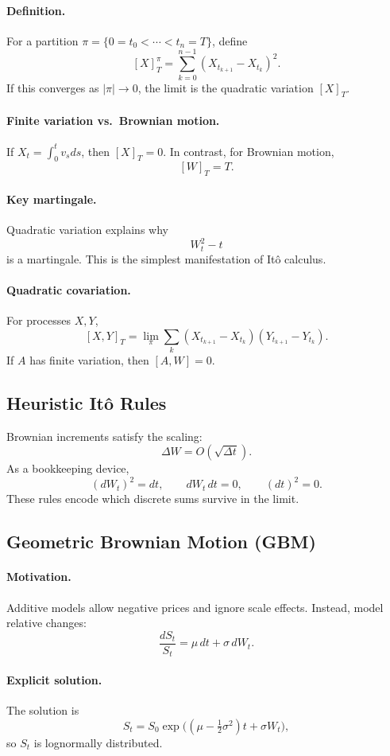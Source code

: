 \documentclass[11pt]{article}
\newcommand{\1}{\mathbf{1}}
\theoremstyle{plain}
\theoremstyle{definition}
\theoremstyle{remark}
\begin{document}
\paragraph{Definition.}
For a partition $\pi=\{0=t_0<\cdots<t_n=T\}$, define
\[
[X]^\pi_T=\sum_{k=0}^{n-1}(X_{t_{k+1}}-X_{t_k})^2.
\]
If this converges as $|\pi|\to0$, the limit is the quadratic variation $[X]_T$.

\paragraph{Finite variation vs.\ Brownian motion.}
If $X_t=\int_0^t v_s ds$, then $[X]_T=0$.
In contrast, for Brownian motion,
\[
[W]_T=T.
\]

\paragraph{Key martingale.}
Quadratic variation explains why
\[
W_t^2-t
\]
is a martingale.
This is the simplest manifestation of Itô calculus.

\paragraph{Quadratic covariation.}
For processes $X,Y$,
\[
[X,Y]_T=\lim_{\pi}\sum_k (X_{t_{k+1}}-X_{t_k})(Y_{t_{k+1}}-Y_{t_k}).
\]
If $A$ has finite variation, then $[A,W]=0$.

\subsection{Heuristic It\^o Rules}

Brownian increments satisfy the scaling:
\[
\Delta W = O(\sqrt{\Delta t}).
\]
As a bookkeeping device,
\[
(dW_t)^2=dt,
\qquad
dW_t\,dt=0,
\qquad
(dt)^2=0.
\]
These rules encode which discrete sums survive in the limit.

\subsection{Geometric Brownian Motion (GBM)}

\paragraph{Motivation.}
Additive models allow negative prices and ignore scale effects.
Instead, model relative changes:
\[
\frac{dS_t}{S_t}=\mu\,dt+\sigma\,dW_t.
\]

\paragraph{Explicit solution.}
The solution is
\[
S_t=S_0\exp\!\Big(
(\mu-\tfrac12\sigma^2)t+\sigma W_t
\Big),
\]
so $S_t$ is lognormally distributed.
\end{document}
